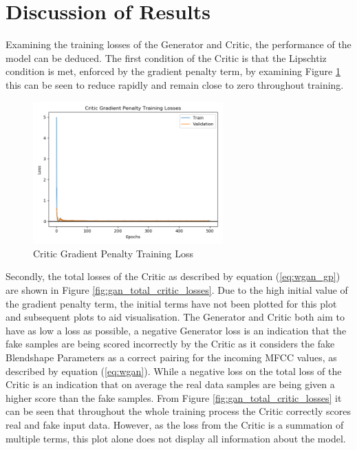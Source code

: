 \section{Discussion of Results}
Examining the training losses of the Generator and Critic, the performance of the model can be deduced.
The first condition of the Critic is that the Lipschtiz condition is met, enforced by the gradient penalty term, by examining Figure \ref{fig:gan_critic_gp} this can be seen to reduce rapidly and remain close to zero throughout training.

\begin{figure}[h!]
    \centering
        \includegraphics[width=0.65\textwidth]{figures/gan/critic_gp_train_losses.png}
    \caption{Critic Gradient Penalty Training Loss}\label{fig:gan_critic_gp}
\end{figure} 

Secondly, the total losses of the Critic as described by equation (\ref{eq:wgan_gp}) are shown in Figure \ref{fig:gan_total_critic_losses}.
Due to the high initial value of the gradient penalty term, the initial terms have not been plotted for this plot and subsequent plots to aid visualisation.
The Generator and Critic both aim to have as low a loss as possible, a negative Generator loss is an indication that the fake samples are being scored incorrectly by the Critic as it considers the fake Blendshape Parameters as a correct pairing for the incoming MFCC values, as described by equation (\ref{eq:wgan}).
While a negative loss on the total loss of the Critic is an indication that on average the real data samples are being given a higher score than the fake samples.
From Figure \ref{fig:gan_total_critic_losses} it can be seen that throughout the whole training process the Critic correctly scores real and fake input data.
However, as the loss from the Critic is a summation of multiple terms, this plot alone does not display all information about the model.

